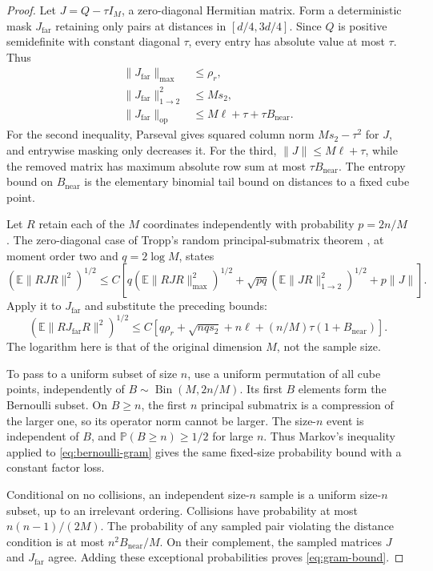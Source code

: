 \begin{proof}
Let $J=Q-\tau I_M$, a zero-diagonal Hermitian matrix. Form a deterministic
mask $J_{\mathrm{far}}$ retaining only pairs at distances in
$[d/4,3d/4]$. Since $Q$ is positive semidefinite with constant diagonal
$\tau$, every entry has absolute value at most $\tau$. Thus
\begin{align*}
 \|J_{\mathrm{far}}\|_{\max}&\le\rho_r,\\
 \|J_{\mathrm{far}}\|_{1\to2}^2&\le M s_2,\\
 \|J_{\mathrm{far}}\|_{\mathrm{op}}
 &\le M\ell+\tau+\tau B_{\mathrm{near}}.
\end{align*}
For the second inequality, Parseval gives squared column norm
$M s_2-\tau^2$ for $J$, and entrywise masking only decreases it.
For the third, $\|J\|\le M\ell+\tau$, while the removed matrix has
maximum absolute row sum at most $\tau B_{\mathrm{near}}$.
The entropy bound on $B_{\mathrm{near}}$ is the elementary binomial
tail bound on distances to a fixed cube point.

Let $R$ retain each of the $M$ coordinates independently with
probability $p=2n/M$. The zero-diagonal case of Tropp's random
principal-submatrix theorem \cite[Theorem 1.1]{tropp2008}, at moment
order two and $q=2\log M$, states
\[
 (\mathbb E\|RJR\|^2)^{1/2}
 \le C\left[q(\mathbb E\|RJR\|_{\max}^2)^{1/2}
       +\sqrt{pq}(\mathbb E\|JR\|_{1\to2}^2)^{1/2}
       +p\|J\|\right].
\]
Apply it to $J_{\mathrm{far}}$ and substitute the preceding bounds:
\begin{equation}\label{eq:bernoulli-gram}
 (\mathbb E\|R J_{\mathrm{far}}R\|^2)^{1/2}
 \le C[q\rho_r+\sqrt{nq s_2}+n\ell
               +(n/M)\tau(1+B_{\mathrm{near}})].
\end{equation}
The logarithm here is that of the original dimension $M$, not the
sample size.

To pass to a uniform subset of size $n$, use a uniform permutation of
all cube points, independently of $B\sim\operatorname{Bin}(M,2n/M)$.
Its first $B$ elements form the Bernoulli subset. On $B\ge n$, the
first $n$ principal submatrix is a compression of the larger one, so
its operator norm cannot be larger. The size-$n$ event is independent
of $B$, and $\mathbb P(B\ge n)\ge1/2$ for large $n$. Thus Markov's
inequality applied to \eqref{eq:bernoulli-gram} gives the same fixed-size
probability bound with a constant factor loss.

Conditional on no collisions, an independent size-$n$ sample is a
uniform size-$n$ subset, up to an irrelevant ordering. Collisions have
probability at most $n(n-1)/(2M)$. The probability of any sampled pair
violating the distance condition is at most $n^2B_{\mathrm{near}}/M$.
On their complement, the sampled matrices $J$ and $J_{\mathrm{far}}$
agree. Adding these exceptional probabilities proves
\eqref{eq:gram-bound}.
\end{proof}

